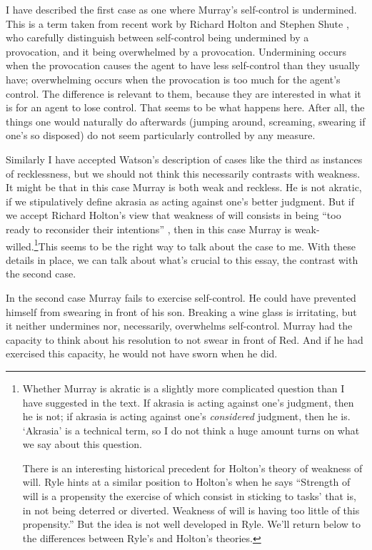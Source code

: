  I have described the first case as one where Murray's self-control is undermined. This is a term taken from recent work by Richard Holton and Stephen Shute \citeyear{HoltonShute2007}, who carefully distinguish between self-control being undermined by a provocation, and it being overwhelmed by a provocation. Undermining occurs when the provocation causes the agent to have less self-control than they usually have; overwhelming occurs when the provocation is too much for the agent's control. The difference is relevant to them, because they are interested in what it is for an agent to lose control. That seems to be what happens here. After all, the things one would naturally do afterwards (jumping around, screaming, swearing if one's so disposed) do not seem particularly controlled by any measure.

Similarly I have accepted Watson's description of cases like the third as instances of recklessness, but we should not think this necessarily contrasts with weakness. It might be that in this case Murray is both weak and reckless. He is not akratic, if we stipulatively define akrasia as acting against one's better judgment. But if we accept Richard Holton's view that weakness of will consists in being ``too ready to reconsider their intentions'' \cite[241]{Holton1999}, then in this case Murray is weak-willed.\footnote{Whether Murray is akratic is a slightly more complicated question than I have suggested in the text. If akrasia is acting against one's judgment, then he is not; if akrasia is acting against one's \textit{considered} judgment, then he is. `Akrasia' is a technical term, so I do not think a huge amount turns on what we say about this question.\par There is an interesting historical precedent for Holton's theory of weakness of will. Ryle hints at a similar position to Holton's when he says ``Strength of will is a propensity the exercise of which consist in sticking to tasks' that is, in not being deterred or diverted. Weakness of will is having too little of this propensity.'' \citeyear[73]{Ryle1949} But the idea is not well developed in Ryle. We'll return below to the differences between Ryle's and Holton's theories.}This seems to be the right way to talk about the case to me. With these details in place, we can talk about what's crucial to this essay, the contrast with the second case.

In the second case Murray fails to exercise self-control. He could have prevented himself from swearing in front of his son. Breaking a wine glass is irritating, but it neither undermines nor, necessarily, overwhelms self-control. Murray had the capacity to think about his resolution to not swear in front of Red. And if he had exercised this capacity, he would not have sworn when he did. 

